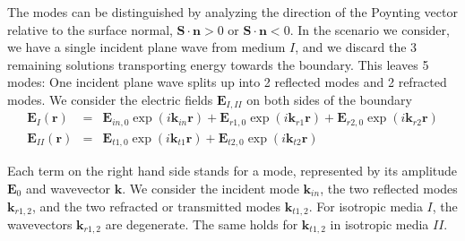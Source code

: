 \documentclass[12pt,a4paper,twoside,openright,BCOR10mm,headsepline,titlepage,abstracton,chapterprefix,final]{scrreprt}
\newcommand\Vector[1]{{\mathbf{#1}}}
\newcommand\Location{\Vector{r}}
\newcommand\wavenumber{k}
\newcommand\Wavevector{\Vector{\wavenumber}}
\newcommand\scalarEfield{E}
\newcommand\Efield{\Vector{\scalarEfield}}
\newcommand\materialone{I}
\newcommand\materialtwo{{II}}
\begin{document}
The modes can be distinguished by analyzing the direction of the Poynting vector relative to the surface normal,
$\Vector{S}\cdot\Vector{n}>0$ or $\Vector{S}\cdot\Vector{n}<0$.
In the scenario we consider, we have a single incident plane wave from medium $\materialone$, 
and we discard the 3 remaining solutions transporting energy towards the boundary.
This leaves 5 modes: One incident plane wave splits up into 2 reflected modes and 2 refracted modes.
We consider the electric fields $\Efield_{\materialone,\materialtwo}$ on both sides of the boundary
\begin{subequations}
\begin{eqnarray}
 \Efield_\materialone(\Location) &=& \Efield_{in,0} \exp(i \Wavevector_{in} \Location) + \Efield_{r1,0} \exp(i \Wavevector_{r1} \Location) + \Efield_{r2,0} \exp(i \Wavevector_{r2} \Location)  \\
 \Efield_\materialtwo(\Location) &=& \Efield_{t1,0} \exp(i \Wavevector_{t1} \Location) + \Efield_{t2,0} \exp(i \Wavevector_{t2} \Location)
\end{eqnarray}
\label{eq:modes_on_boundary} 
\end{subequations}

Each term on the right hand side stands for a mode, represented by its amplitude $\Efield_{0}$ and wavevector $\Wavevector$.
We consider the incident mode $\Wavevector_{in}$, 
the two reflected modes $\Wavevector_{r1,2}$,
and the two refracted or transmitted modes $\Wavevector_{t1,2}$.
For isotropic media $\materialone$, the wavevectors $\Wavevector_{r1,2}$ are degenerate. 
The same holds for $\Wavevector_{t1,2}$ in isotropic media $\materialtwo$.
\end{document}
